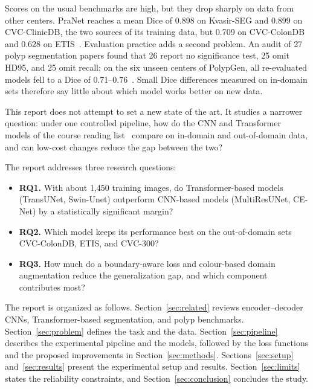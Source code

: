 \documentclass[10pt,twoside]{article}
\begin{document}
Scores on the usual benchmarks are high, but they drop sharply on data from other
centers. PraNet reaches a mean Dice of 0.898 on Kvasir-SEG and 0.899 on
CVC-ClinicDB, the two sources of its training data, but 0.709 on CVC-ColonDB and
0.628 on ETIS~\cite{fan2020pranet}. Evaluation practice adds a second problem. An
audit of 27 polyp segmentation papers found that 26 report no significance test,
25 omit HD95, and 25 omit recall; on the six unseen centers of PolypGen, all
re-evaluated models fell to a Dice of 0.71--0.76~\cite{urooj2026audit}. Small Dice
differences measured on in-domain sets therefore say little about which model works
better on new data.

This report does not attempt to set a new state of the art. It studies a narrower
question: under one controlled pipeline, how do the CNN and Transformer models of
the course reading list~\cite{ronneberger2015unet,chen2021transunet,cao2022swinunet,ibtehaz2020multiresunet,gu2019cenet,isensee2018nnunet}
compare on in-domain and out-of-domain data, and can low-cost changes reduce the gap
between the two?

The report addresses three research questions:
\begin{itemize}
  \item \textbf{RQ1.} With about 1,450 training images, do Transformer-based models
  (TransUNet, Swin-Unet) outperform CNN-based models (MultiResUNet, CE-Net) by a
  statistically significant margin?
  \item \textbf{RQ2.} Which model keeps its performance best on the out-of-domain
  sets CVC-ColonDB, ETIS, and CVC-300?
  \item \textbf{RQ3.} How much do a boundary-aware loss and colour-based domain
  augmentation reduce the generalization gap, and which component contributes most?
\end{itemize}

The report is organized as follows. Section~\ref{sec:related} reviews encoder--decoder
CNNs, Transformer-based segmentation, and polyp benchmarks. Section~\ref{sec:problem}
defines the task and the data. Section~\ref{sec:pipeline} describes the experimental
pipeline and the models, followed by the loss functions and the proposed improvements
in Section~\ref{sec:methods}. Sections~\ref{sec:setup} and~\ref{sec:results} present
the experimental setup and results. Section~\ref{sec:limits} states the reliability
constraints, and Section~\ref{sec:conclusion} concludes the study.

\end{document}
